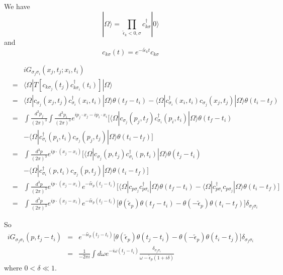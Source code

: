 \documentclass[12pt]{book}
\begin{document}
	We have
	\begin{equation}
		|\Omega\rangle=\prod_{\tilde\epsilon_k<0,\sigma}c_{k\sigma}^\dagger|0\rangle
	\end{equation}
	and
	\begin{equation}
		c_{k\sigma}(t)=e^{-i\tilde\epsilon_kt}c_{k\sigma}
	\end{equation}
	
	\begin{eqnarray}
		&&iG_{\sigma_j\sigma_i}(x_j,t_j;x_i,t_i)\\
		&=&\langle \Omega|T[c_{k\sigma_j}(t_j)c_{k\sigma_i}^{\dagger}(t_i)]|\Omega\rangle\\
		&=&\langle \Omega|c_{\sigma_j}(x_j,t_j)c_{\sigma_i}^{\dagger}(x_i,t_i)|\Omega\rangle\theta(t_f-t_i)-\langle \Omega|c_{\sigma_i}^{\dagger}(x_i,t_i)c_{\sigma_j}(x_j,t_j)|\Omega\rangle\theta(t_i-t_f)\\
		&=&\int\frac{d^3p_j}{(2\pi)^3}\int\frac{d^3p_i}{(2\pi)^3}e^{ip_j\cdot x_j-ip_i\cdot x_i}\big[\langle \Omega|c_{\sigma_j}(p_j,t_f)c_{\sigma_i}^{\dagger}(p_i,t_i)|\Omega\rangle\theta(t_f-t_i)\nonumber\\
		&&-\langle \Omega|c_{\sigma_i}^{\dagger}(p_i,t_i)c_{\sigma_j}(p_j,t_j)|\Omega\rangle\theta(t_i-t_f)\big]\\
		&=&\int\frac{d^3p}{(2\pi)^3}e^{ip\cdot(x_j-x_i)}\big[\langle \Omega|c_{\sigma_j}(p,t_j)c_{\sigma_i}^{\dagger}(p,t_i)|\Omega\rangle\theta(t_j-t_i)\nonumber\\
		&&-\langle \Omega|c_{\sigma_i}^{\dagger}(p,t_i)c_{\sigma_j}(p,t_j)|\Omega\rangle\theta(t_i-t_f)\big]\\
		&=&\int\frac{d^3p}{(2\pi)^3}e^{ip\cdot(x_j-x_i)}e^{-i\tilde\epsilon_p(t_j-t_i)}\big[\langle \Omega|c_{p\sigma_j}c_{p\sigma_i}^{\dagger}|\Omega\rangle\theta(t_f-t_i)-\langle \Omega|c_{p\sigma_i}^{\dagger}c_{p\sigma_j}|\Omega\rangle\theta(t_i-t_f)\big]\\
		&=&\int\frac{d^3p}{(2\pi)^3}e^{ip\cdot(x_j-x_i)}e^{-i\tilde\epsilon_p(t_j-t_i)}\big[\theta(\tilde\epsilon_p)\theta(t_f-t_i)-\theta(-\tilde\epsilon_p)\theta(t_i-t_f)\big]\delta_{\sigma_j\sigma_i}
	\end{eqnarray}
	
	So
	\begin{eqnarray}
		iG_{\sigma_j\sigma_i}(p,t_j-t_i)&=&e^{-i\tilde\epsilon_p(t_j-t_i)}\big[\theta(\tilde\epsilon_p)\theta(t_j-t_i)-\theta(-\tilde\epsilon_p)\theta(t_i-t_j)\big]\delta_{\sigma_j\sigma_i}\\
		&=&\frac 1{-2\pi i}\int d\omega e^{-i\omega(t_j-t_i)}\frac {\delta_{\sigma_j\sigma_i}}{\omega-\tilde\epsilon_p(1+i\delta)}\label{eqn:boson_contour_int}
	\end{eqnarray}
	where $0<\delta\ll 1$.
	
\end{document}
